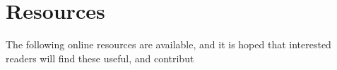 \section{Resources}

The following online resources are available, and it is hoped that interested readers will find these useful, and contribut